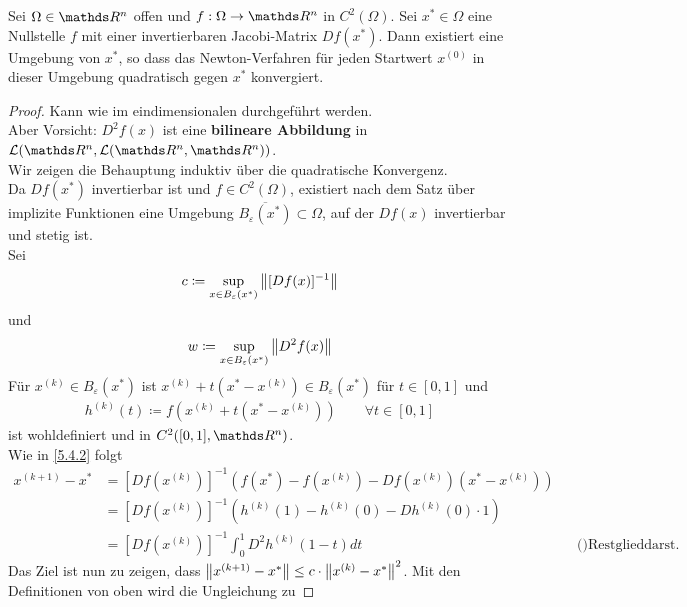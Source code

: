 \begin{Satze}
	Sei $\Omega\in\R^n$ offen und $f:\Omega\rightarrow\Ren$ in $C^2(\Omega)$.
	Sei $x^{*}\in\Omega $ eine Nullstelle $f$ mit einer invertierbaren Jacobi-Matrix $Df(x^{*})$.
	Dann existiert eine Umgebung von $x^{*}$, so dass das Newton-Verfahren 
	für jeden Startwert $x^{(0)}$ in dieser Umgebung
	quadratisch gegen $x^{*}$ konvergiert.
\end{Satze}

\begin{proof}
	Kann wie im eindimensionalen durchgeführt werden.\\
	Aber Vorsicht: $D^2f(x)$ ist eine \textbf{bilineare Abbildung} in 
	$\mathcal{L}(\Ren, \mathcal{L}(\Ren, \Ren))$. \\
	
	Wir zeigen die Behauptung induktiv über die quadratische Konvergenz.\\
	Da $Df(x^{*})$ invertierbar ist und $f\in C^2(\Omega) $,
	existiert nach dem Satz über implizite Funktionen
	eine Umgebung $\overline{B_\varepsilon(x^{*})}\subset \Omega$,
	auf der $Df(x)$ invertierbar und stetig ist.\\
	Sei 
	\begin{gather*}
	c\coloneqq \sup_{x\in B_\varepsilon(x^{*})} \left\| [Df(x)]^{-1} \right\|
	\end{gather*}
	und 
	\begin{gather*}
	w\coloneqq \sup_{x\in B_\varepsilon(x^{*})}\left\| D^2f(x) \right\|
	\end{gather*}
	Für $x^{(k)}\in B_\varepsilon(x^{*}) $ ist $x^{(k)}+t(x^{*}-x^{(k)})\in B_\varepsilon(x^{*})$
	für $t\in [0,1]$ und 
	\begin{gather*}
	h^{(k)}(t) \coloneqq f(x^{(k)}+ t(x^{*}-x^{(k)}))\qquad \forall t\in [0,1]
	\end{gather*}
	ist wohldefiniert und in $C^2([0,1], \Ren)$.\\
	Wie in \ref{5.4.2} folgt 
	\begin{align*}
	x^{(k+1)}-x^{*} &= [Df(x^{(k)})]^{-1}\left(f(x^{*})-f(x^{(k)})-Df(x^{(k)})(x^{*}-x^{(k)})\right)\\
	&= [Df(x^{(k)})]^{-1}\left( h^{(k)}(1)-h^{(k)}(0)-Dh^{(k)}(0)\cdot 1\right)\\
	&= [Df(x^{(k)})]^{-1} \int_{0}^{1}D^2h^{(k)}(1-t)dt &&\text{()Restglieddarst. der Taylorentw.)}
	\end{align*}
	Das Ziel ist nun zu zeigen, dass $\left\| x^{(k+1)}-x^{*} \right\| \leq c\cdot \left\| x^{(k)}-x^{*} \right\|^2$.
	Mit den Definitionen von oben wird die Ungleichung zu

\end{proof}
